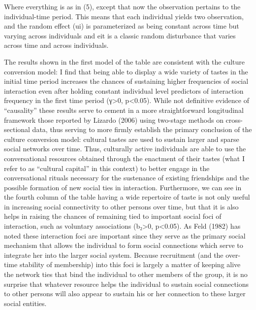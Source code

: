 Where everything is as in (5), except that now the observation pertains to the individual-time period. This means that each individual yields two observation, and the random effect (ui) is parameterized as being constant across time but varying across individuals and eit is a classic random disturbance that varies across time and across individuals.

The results shown in the first model of the table are consistent with the culture conversion model: I find that being able to display a wide variety of tastes in the initial time period increases the chances of sustaining higher frequencies of social interaction even after holding constant individual level predictors of interaction frequency in the first time period (γ>0, p<0.05). While not definitive evidence of “causality” these results serve to cement in a more straightforward longitudinal framework those reported by Lizardo (2006) using two-stage methods on cross-sectional data, thus serving to more firmly establish the primary conclusion of the culture conversion model: cultural tastes are used to sustain larger and sparse social networks over time. Thus, culturally active individuals are able to use the conversational resources obtained through the enactment of their tastes (what I refer to as “cultural capital” in this context) to better engage in the conversational rituals necessary for the sustenance of existing friendships and the possible formation of new social ties in interaction. Furthermore, we can see in the fourth column of the table having a wide repertoire of taste is not only useful in increasing social connectivity to other persons over time, but that it is also helps in raising the chances of remaining tied to important social foci of interaction, such as voluntary associations (b₂>0, p<0.05). As Feld (1982) has noted these interaction foci are important since they serve as the primary social mechanism that allows the individual to form social connections which serve to integrate her into the larger social system. Because recruitment (and the over-time stability of membership) into this foci is largely a matter of keeping alive the network ties that bind the individual to other members of the group, it is no surprise that whatever resource helps the individual to sustain social connections to other persons will also appear to sustain his or her connection to these larger social entities.

